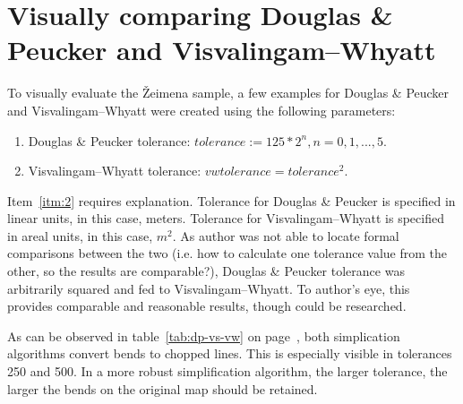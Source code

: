 \documentclass[a4paper]{article}
\newcommand{\DP}{Douglas \& Peucker}
\newcommand{\VW}{Visvalingam--Whyatt}
\begin{document}
\section{Visually comparing {\DP} and {\VW}}

To visually evaluate the Žeimena sample, a few examples for {\DP} and {\VW}
were created using the following parameters:

\begin{enumerate}[label=(\Roman*)]
    \item {\DP} tolerance: $tolerance := 125 * 2^n, n = 0,1,...,5$.
    \item {\VW} tolerance: $vwtolerance = tolerance ^ 2$\label{itm:2}.
\end{enumerate}

Item~\ref{itm:2} requires explanation. Tolerance for {\DP} is specified in
linear units, in this case, meters. Tolerance for {\VW} is specified in areal
units, in this case, $m^2$. As author was not able to locate formal comparisons
between the two (i.e. how to calculate one tolerance value from the other, so
the results are comparable?), {\DP} tolerance was arbitrarily squared and fed
to {\VW}. To author's eye, this provides comparable and reasonable results,
though could be researched.

As can be observed in table~\ref{tab:dp-vs-vw} on page~\pageref{tab:dp-vs-vw},
both simplication algorithms convert bends to chopped lines. This is especially
visible in tolerances 250 and 500. In a more robust simplification algorithm,
the larger tolerance, the larger the bends on the original map should be
retained.
\end{document}
